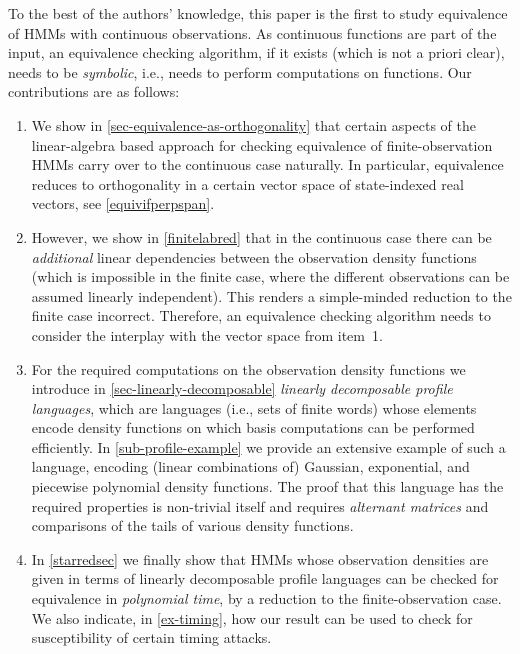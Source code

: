 \documentclass[a4paper,UKenglish,cleveref, autoref,mathscr]{lipics-v2019}
\newcommand{\1}{\mathbbm{1}}
\begin{document}
To the best of the authors' knowledge, this paper is the first to study equivalence of HMMs with continuous observations.
As continuous functions are part of the input, an equivalence checking algorithm, if it exists (which is not a priori clear), needs to be \emph{symbolic}, i.e., needs to perform computations on functions.
Our contributions are as follows:
\begin{enumerate}
\item
We show in \cref{sec-equivalence-as-orthogonality} that certain aspects of the linear-algebra based approach for checking equivalence of finite-observation HMMs carry over to the continuous case naturally.
In particular, equivalence reduces to orthogonality in a certain vector space of state-indexed real vectors, see \cref{equivifperpspan}.
\item
However, we show in \cref{finitelabred} that in the continuous case there can be \emph{additional} linear dependencies between the observation density functions (which is impossible in the finite case, where the different observations can be assumed linearly independent).
This renders a simple-minded reduction to the finite case incorrect.
Therefore, an equivalence checking algorithm needs to consider the interplay with the vector space from item~1.
\item
For the required computations on the observation density functions we introduce in \cref{sec-linearly-decomposable} \emph{linearly decomposable profile languages}, which are languages (i.e., sets of finite words) whose elements encode density functions on which basis computations can be performed efficiently.
In \cref{sub-profile-example} we provide an extensive example of such a language, encoding (linear combinations of) Gaussian, exponential, and piecewise polynomial density functions.
The proof that this language has the required properties is non-trivial itself and requires \emph{alternant matrices} and comparisons of the tails of various density functions.
\item
In \cref{starredsec} we finally show that HMMs whose observation densities are given in terms of linearly decomposable profile languages can be checked for equivalence in \emph{polynomial time}, by a reduction to the finite-observation case.
We also indicate, in \cref{ex-timing}, how our result can be used to check for susceptibility of certain timing attacks.
\end{enumerate}
\end{document}
